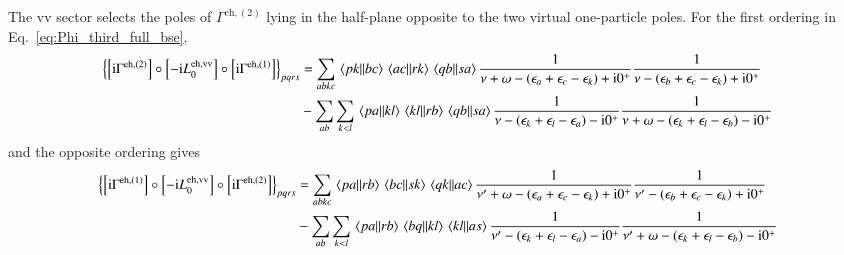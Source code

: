 \documentclass[aip,jcp,reprint,noshowkeys,superscriptaddress]{revtex4-1}
\newcommand{\eps}{\epsilon}
\newcommand{\ii}{\mathrm{i}}
\newcommand{\eh}{\text{eh}}
\begin{document}
The $\text{vv}$ sector selects the poles of $\Gamma^{\eh,(2)}$ lying in the
half-plane opposite to the two virtual one-particle poles.
For the first ordering in Eq.~\eqref{eq:Phi_third_full_bse},
\begin{equation}
    \begin{split}
    \left\{
    \left[\ii\Gamma^{\eh,(2)}\right]
    \circ\left[-\ii L_0^{\eh,\text{vv}}\right]
    \circ\left[\ii\Gamma^{\eh,(1)}\right]
    \right\}_{pqrs}
    & =
    \sum_{abkc}
    \mel{pk}{}{bc}\mel{ac}{}{rk}\mel{qb}{}{sa}
    \frac{1}{\nu+\omega-(\eps_a+\eps_c-\eps_k)+\ii0^+}
    \frac{1}{\nu-(\eps_b+\eps_c-\eps_k)+\ii0^+}
    \\
    &-
    \sum_{ab}\sum_{k<l}
    \mel{pa}{}{kl}\mel{kl}{}{rb}\mel{qb}{}{sa}
    \frac{1}{\nu-(\eps_k+\eps_l-\eps_a)-\ii0^+}
    \frac{1}{\nu+\omega-(\eps_k+\eps_l-\eps_b)-\ii0^+}
    \end{split}
    \label{eq:Phi_eh_third_vv_left}
\end{equation}
and the opposite ordering gives
\begin{equation}
    \begin{split}
    \left\{
    \left[\ii\Gamma^{\eh,(1)}\right]
    \circ\left[-\ii L_0^{\eh,\text{vv}}\right]
    \circ\left[\ii\Gamma^{\eh,(2)}\right]
    \right\}_{pqrs}
    & =
    \sum_{abkc}
    \mel{pa}{}{rb}\mel{bc}{}{sk}\mel{qk}{}{ac}
    \frac{1}{\nu'+\omega-(\eps_a+\eps_c-\eps_k)+\ii0^+}
    \frac{1}{\nu'-(\eps_b+\eps_c-\eps_k)+\ii0^+}
    \\
    &-
    \sum_{ab}\sum_{k<l}
    \mel{pa}{}{rb}\mel{bq}{}{kl}\mel{kl}{}{as}
    \frac{1}{\nu'-(\eps_k+\eps_l-\eps_a)-\ii0^+}
    \frac{1}{\nu'+\omega-(\eps_k+\eps_l-\eps_b)-\ii0^+}
    \end{split}
    \label{eq:Phi_eh_third_vv_right}
\end{equation}
\end{document}
